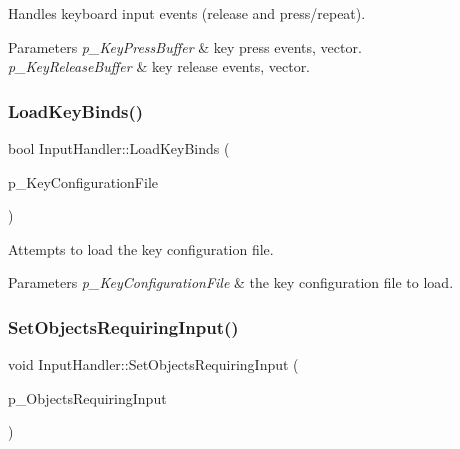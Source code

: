 Handles keyboard input events (release and press/repeat). 


\begin{DoxyParams}{Parameters}
{\em p\+\_\+\+Key\+Press\+Buffer} & key press events, vector. \\
\hline
{\em p\+\_\+\+Key\+Release\+Buffer} & key release events, vector. \\
\hline
\end{DoxyParams}
\mbox{\label{class_input_handler_a0014003118a5ae9a89dc5c3268bc90eb}} 
\subsubsection{\texorpdfstring{LoadKeyBinds()}{LoadKeyBinds()}}
{\footnotesize\ttfamily bool Input\+Handler\+::\+Load\+Key\+Binds (\begin{DoxyParamCaption}\item[{const std\+::string \&}]{p\+\_\+\+Key\+Configuration\+File }\end{DoxyParamCaption})}



Attempts to load the key configuration file. 


\begin{DoxyParams}{Parameters}
{\em p\+\_\+\+Key\+Configuration\+File} & the key configuration file to load. \\
\hline
\end{DoxyParams}
\mbox{\label{class_input_handler_aca8287951c2ebe1c3c3e7f305f52e076}} 
\subsubsection{\texorpdfstring{SetObjectsRequiringInput()}{SetObjectsRequiringInput()}}
{\footnotesize\ttfamily void Input\+Handler\+::\+Set\+Objects\+Requiring\+Input (\begin{DoxyParamCaption}\item[{std\+::unordered\+\_\+multimap$<$ std\+::type\+\_\+index, std\+::shared\+\_\+ptr$<$ \mbox{\hyperlink{class_game_object}{Game\+Object}} $>$$>$}]{p\+\_\+\+Objects\+Requiring\+Input }\end{DoxyParamCaption})}




